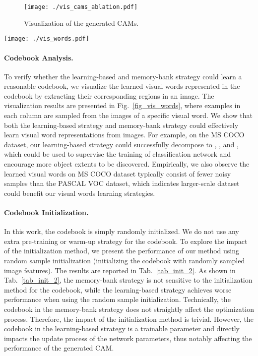\begin{figure}[htp]
  \centering
  \setlength{\tabcolsep}{2pt}
  \texttt{[image: ./vis\_cams\_ablation.pdf]}
  \caption{Visualization of the generated CAMs.}
  \label{fig_vis_cams_ablation}
\end{figure}

\begin{figure*}[htp]
  \centering
  \texttt{[image: ./vis\_words.pdf]}
  \caption{Visualization of the visual words learned by learning strategy and memory-bank strategy. Each column denotes the example images sampled from a visual word category.}
  \label{fig_vis_words}
\end{figure*}

\paragraph{\textbf{Codebook Analysis.}} To verify whether the learning-based and memory-bank strategy could learn a reasonable codebook, we visualize the learned visual words represented in the codebook by extracting their corresponding regions in an image. The visualization results are presented in Fig.~\ref{fig_vis_words}, where examples in each column are sampled from the images of a specific visual word. We show that both the learning-based strategy and memory-bank strategy could effectively learn visual word representations from images. For example, on the MS COCO dataset, our learning-based strategy could successfully decompose  to , ,  and  \etc, which could be used to supervise the training of classification network and encourage more object extents to be discovered. Empirically, we also observe the learned visual words on MS COCO dataset typically consist of fewer noisy samples than the PASCAL VOC dataset, which indicates larger-scale dataset could benefit our visual words learning strategies.

\paragraph{\textbf{Codebook Initialization.}} \label{sec_codebook_init}
In this work, the codebook is simply randomly initialized. We do not use any extra pre-training or warm-up strategy for the codebook. To explore the impact of the initialization method, we present the performance of our method using {random sample} initialization (initializing the codebook with randomly sampled image features). The results are reported in Tab.~\ref{tab_init_2}. As shown in Tab.~\ref{tab_init_2}, the memory-bank strategy is not sensitive to the initialization method for the codebook, while the learning-based strategy achieves worse performance when using the random sample initialization. Technically, the codebook in the memory-bank strategy does not straightly affect the optimization process. Therefore, the impact of the initialization method is trivial. However, the codebook in the learning-based strategy is a trainable parameter and directly impacts the update process of the network parameters, thus notably affecting the performance of the generated CAM.

